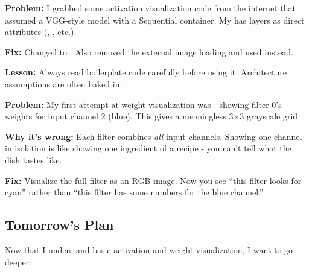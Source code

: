 \documentclass[9pt,a4paper,twocolumn,twoside]{tau-class/tau}
\begin{document}
        \begin{tauenv}[frametitle=Issue: Boilerplate Code Assumed Wrong Architecture]
            \textbf{Problem:} I grabbed some activation visualization code from the internet that assumed a VGG-style model with a  Sequential container. My  has layers as direct attributes (, , etc.).

            \textbf{Fix:} Changed  to . Also removed the external image loading and used  instead.

            \textbf{Lesson:} Always read boilerplate code carefully before using it. Architecture assumptions are often baked in.
        \end{tauenv}

        \begin{tauenv}[frametitle=Issue: Individual Weight Slices Are Uninterpretable]
            \textbf{Problem:} My first attempt at weight visualization was  - showing filter 0's weights for input channel 2 (blue). This gives a meaningless 3$\times$3 grayscale grid.

            \textbf{Why it's wrong:} Each filter combines \textit{all} input channels. Showing one channel in isolation is like showing one ingredient of a recipe - you can't tell what the dish tastes like.

            \textbf{Fix:} Visualize the full  filter as an RGB image. Now you see ``this filter looks for cyan'' rather than ``this filter has some numbers for the blue channel.''
        \end{tauenv}

    \subsection{Tomorrow's Plan}

        Now that I understand basic activation and weight visualization, I want to go deeper:
\end{document}
